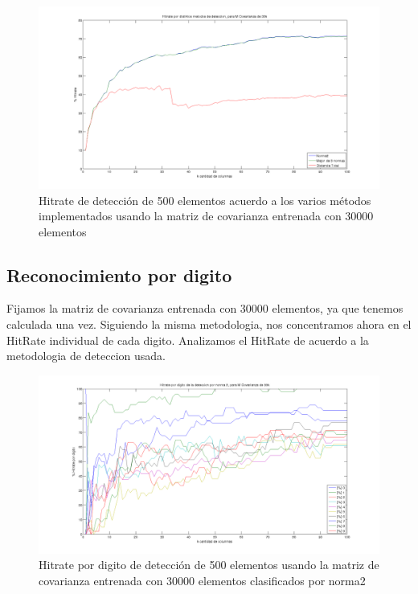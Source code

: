 \begin{figure}[H]
\begin {center}
\includegraphics[width=400pt]{plots/hitrate-30kcv.png}
\end {center}
\caption{Hitrate de detecci\'on de 500 elementos acuerdo a los varios m\'etodos implementados
usando la matriz de covarianza entrenada con 30000 elementos}
\label{fig:HR30kcv}
\end{figure}



\subsection{Reconocimiento por digito}
Fijamos la matriz de covarianza entrenada con 30000 elementos, ya que tenemos calculada una vez.
Siguiendo la misma metodologia, nos concentramos ahora en el HitRate individual
de cada digito. Analizamos el HitRate de acuerdo a la metodologia de deteccion usada.


\begin{figure}[H]
\begin {center}
\includegraphics[width=400pt]{plots/pordig-30kcv-norma2.png}
\end {center}
\caption{Hitrate por digito de detecci\'on de 500 elementos usando la matriz de covarianza entrenada con 30000 elementos
clasificados por norma2}
\label{fig:HRD30kcv-n2}
\end{figure}

